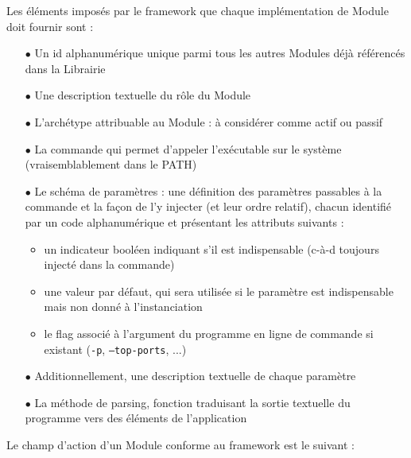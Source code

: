 \documentclass[]{article}
\begin{document}
Les éléments imposés par le framework que chaque implémentation de Module doit fournir sont :
\vspace{0.1cm} 
\begin{itemize}
\item[$\bullet$] Un id alphanumérique unique parmi tous les autres Modules déjà référencés dans la Librairie
\item[$\bullet$] Une description textuelle du rôle du Module
\item[$\bullet$] L'archétype attribuable au Module : à considérer comme actif ou passif
\item[$\bullet$] La commande qui permet d'appeler l'exécutable sur le système (vraisemblablement dans le PATH)
\item[$\bullet$] Le schéma de paramètres : une définition des paramètres passables à la commande et la façon de l'y injecter (et leur ordre relatif), chacun identifié par un code alphanumérique et présentant les attributs suivants :
\begin{itemize}
\item un indicateur booléen indiquant s'il est indispensable (c-à-d toujours injecté dans la commande)
\item une valeur par défaut, qui sera utilisée si le paramètre est indispensable mais non donné à l'instanciation
\item le flag associé à l'argument du programme en ligne de commande si existant (\texttt{-p}, \texttt{--top-ports}, ...)
\end{itemize}
\item[$\bullet$] Additionnellement, une description textuelle de chaque paramètre
\item[$\bullet$] La méthode de parsing, fonction traduisant la sortie textuelle du programme vers des éléments de l'application
\end{itemize}

\vspace{1cm}

Le champ d'action d'un Module conforme au framework est le suivant :
\end{document}
